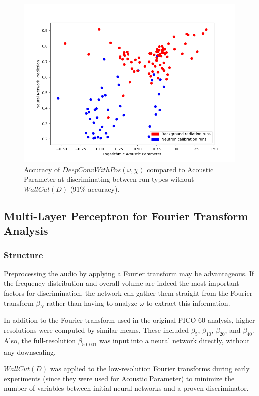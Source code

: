 \documentclass[10pt]{article}
\begin{document}
\begin{figure}[h]
    \centering
    \includegraphics[width=\textwidth]{waveform_best_validation}
    \caption{\label{waveform_best_validation} Accuracy of $DeepConvWithPos(\omega, \chi)$ compared to Acoustic Parameter at discriminating between run types without $WallCut(D)$ (91\% accuracy).}
\end{figure}

\subsection{Multi-Layer Perceptron for Fourier Transform Analysis}

\subsubsection{Structure}

Preprocessing the audio by applying a Fourier transform may be advantageous. If the frequency distribution and overall volume are indeed the most important factors for discrimination, the network can gather them straight from the Fourier transform $\beta_{N}$ rather than having to analyze $\omega$ to extract this information.

In addition to the Fourier transform used in the original PICO-60 analysis, higher resolutions were computed by similar means. These included $\beta _{5}$, $\beta _{10}$, $\beta _{20}$, and $\beta _{40}$. Also, the full-resolution $\beta _{50,001}$ was input into a neural network directly, without any downscaling.

$WallCut(D)$ was applied to the low-resolution Fourier transforms during early experiments (since they were used for Acoustic Parameter) to minimize the number of variables between initial neural networks and a proven discriminator.
\end{document}
